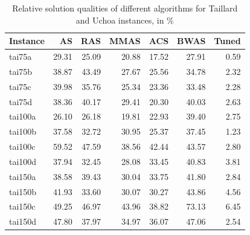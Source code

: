\documentclass[12pt,a4paper,oneside]{book}
\begin{document}
\begin{table}[]
\centering
\caption{Relative solution qualities of different algorithms for Taillard and Uchoa instances, in \%}
\label{tbl:tai-uchoa}
\begin{tabular}{|l|r|r|r|r|r|r|}
\hline
\textbf{Instance}        & \textbf{AS}     & \textbf{RAS}    & \textbf{MMAS}   & \textbf{ACS}    & \textbf{BWAS}   & \textbf{Tuned}  \\ \hline
tai75a                   & 29.31           & 25.09           & 20.88           & 17.52           & 27.91           & 0.59            \\ \hline
tai75b                   & 38.87           & 43.49           & 27.67           & 25.56           & 34.78           & 2.32            \\ \hline
tai75c                   & 39.98           & 35.76           & 25.34           & 23.36           & 33.48           & 2.28            \\ \hline
tai75d                   & 38.36           & 40.17           & 29.41           & 20.30            & 40.03           & 2.63            \\ \hline
tai100a                  & 26.10            & 26.18           & 19.81           & 22.93           & 39.40            & 2.75            \\ \hline
tai100b                  & 37.58           & 32.72           & 30.95           & 25.37           & 37.45           & 1.23            \\ \hline
tai100c                  & 59.52           & 47.59           & 38.56           & 42.44           & 43.57           & 2.80             \\ \hline
tai100d                  & 37.94           & 32.45           & 28.08           & 33.45           & 40.83           & 3.81            \\ \hline
tai150a                  & 38.58           & 39.43           & 30.04           & 33.75           & 41.80            & 2.84            \\ \hline
tai150b                  & 41.93           & 33.60            & 30.07           & 30.27           & 43.86           & 4.56            \\ \hline
tai150c                  & 49.25           & 46.97           & 43.96           & 38.82           & 73.13           & 6.45            \\ \hline
tai150d                  & 47.80            & 37.97           & 34.97           & 36.07           & 47.06           & 2.54            \\ \hline

\end{tabular}
\end{table}
\end{document}
